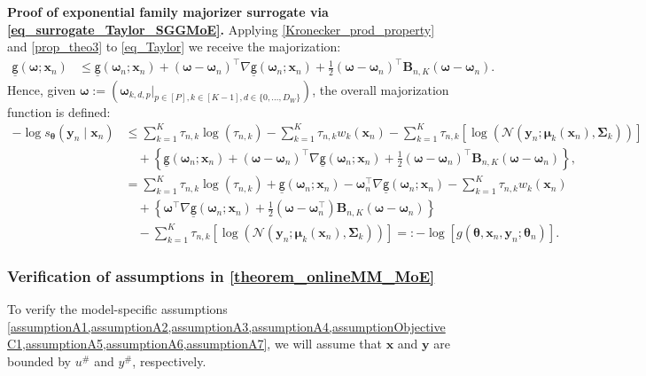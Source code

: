 \documentclass{article}
\newcommand{\cN}{\mathcal{N}}
\def\omegab      {{\sbmm{\omega}}\XS}      \def\Omegab    {{\sbmm{\Omega}}\XS}
\def\XS{\xspace}
\def\sbmm#1{\ensuremath{\boldsymbol{#1}}}
\def\sfg{\mathsf{g}}
\def\vmu{{\bm{\mu}}}
\def\vomega{{\bm{\omega}}}
\def\vtheta{{\bm{\theta}}}
\def\vx{{\bm{x}}}
\def\vy{{\bm{y}}}
\def\evu{{u}}
\def\mB{{\bm{B}}}
\def\mSigma{{\bm{\Sigma}}}
\begin{document}
{\bf Proof of exponential family majorizer surrogate via \cref{eq_surrogate_Taylor_SGGMoE}.} Applying \cref{Kronecker_prod_property} and \cref{prop_theo3} to \cref{eq_Taylor} we receive the majorization:
\begin{align*}
    \underline{\sfg}(\vomega;\vx_n) &\leq \underline{\sfg}(\vomega_n;\vx_n)+ \left(\vomega-\vomega_n\right)^{\top}\nabla \underline{\sfg}(\vomega_n;\vx_n)+\frac{1}{2}\left(\vomega-\vomega_n\right)^{\top}\mB_{n,K}\left(\vomega-\vomega_n\right).
\end{align*}
Hence, given $\vomega
:=\left(\omegab_{k,d,p}\vert_{p\in [P], k\in[K-1], d\in\{0,\ldots,D_W\}}\right)$, the overall majorization function is defined:
\begin{align*}
    -\log s_{\vtheta}(\vy_n\mid \vx_n)
    &\le \sum_{k=1}^{K}\tau_{n,k}\log(\tau_{n,k})-\sum_{k=1}^{K}\tau_{n,k}w_k(\vx_n)-\sum_{k=1}^{K}\tau_{n,k}\left[\log(\cN(\vy_n;\vmu_k(\vx_n),\mSigma_k))\right]\\
    &\quad +\left\{\underline{\sfg}(\vomega_n;\vx_n)+ \left(\vomega-\vomega_n\right)^{\top}\nabla \underline{\sfg}(\vomega_n;\vx_n)+\frac{1}{2}\left(\vomega-\vomega_n\right)^{\top}\mB_{n,K}\left(\vomega-\vomega_n\right)\right\}, 
   \\
     &=\sum_{k=1}^{K}\tau_{n,k}\log(\tau_{n,k})+\underline{\sfg}(\vomega_n;\vx_n)-\vomega_{n}^{\top}\nabla \underline{\sfg}(\vomega_n;\vx_n)-\sum_{k=1}^{K}\tau_{n,k}w_k(\vx_n)\\
    &\quad +\left\{\vomega^{\top}\nabla \underline{\sfg}(\vomega_n;\vx_n)+\frac{1}{2}(\vomega-\vomega_{n}^{\top})\mB_{n,K}\left(\vomega-\vomega_n\right)\right\} 
   \\
    &\quad -\sum_{k=1}^{K}\tau_{n,k}\left[\log(\cN(\vy_n;\vmu_k(\vx_n),\mSigma_k))\right]=:-\log[g(\vtheta, \vx_{n},\vy_{n}; \vtheta_{n})].  
\end{align*}

\subsubsection{Verification of assumptions in \texorpdfstring{\cref{theorem_onlineMM_MoE}}{Theorem \ref*{theorem_onlineMM_MoE}}}\label{proof_assumption_theorem_onlineMM_MoE}

To verify the model-specific assumptions
\cref{assumptionA1,assumptionA2,assumptionA3,assumptionA4,assumptionObjectiveC1,assumptionA5,assumptionA6,assumptionA7}, we will assume that $\vx$ and $\vy$ are bounded by $\evu^\#$ and $y^\#$, respectively. 
\end{document}
